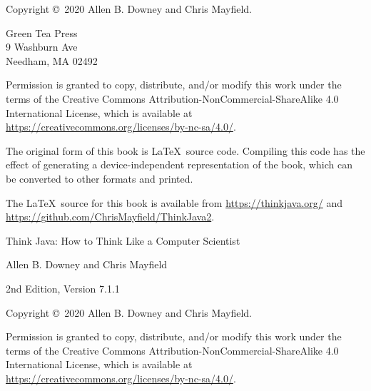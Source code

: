 \documentclass[12pt]{book}
\newcommand{\thetitle}{Think Java}
\newcommand{\thesubtitle}{How to Think Like a Computer Scientist}
\newcommand{\theauthors}{Allen B. Downey and Chris Mayfield}
\newcommand{\theversion}{2nd Edition, Version 7.1.1}
\theoremstyle{exercise}
\begin{document}
\begin{latexonly}
\newpage
\thispagestyle{empty}

Copyright \copyright ~2020 \theauthors.

\vspace{0.2in}

\begin{flushleft}
Green Tea Press \\
9 Washburn Ave \\
Needham, MA 02492
\end{flushleft}

Permission is granted to copy, distribute, and/or modify this work under the terms of the Creative Commons Attribution-NonCommercial-ShareAlike 4.0 International License, which is available at \url{https://creativecommons.org/licenses/by-nc-sa/4.0/}.

The original form of this book is \LaTeX\ source code.
Compiling this code has the effect of generating a device-independent representation of the book, which can be converted to other formats and printed.

The \LaTeX\ source for this book is available from \url{https://thinkjava.org/} and \url{https://github.com/ChrisMayfield/ThinkJava2}.


\cleardoublepage
\setcounter{tocdepth}{1}
\tableofcontents

\end{latexonly}


\begin{htmlonly}

\vspace{1em}

{\Large \thetitle: \thesubtitle}

{\large \theauthors}

\theversion

\vspace{1em}

Copyright \copyright ~2020 \theauthors.

Permission is granted to copy, distribute, and/or modify this work under the terms of the Creative Commons Attribution-NonCommercial-ShareAlike 4.0 International License, which is available at \url{https://creativecommons.org/licenses/by-nc-sa/4.0/}.

\vspace{1em}

\end{htmlonly}
\end{document}
